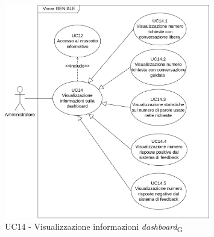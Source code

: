 \begin{figure}[H]
\centering
\includegraphics[width=0.8\textwidth]{contents/casi_duso/png/UC14.png}
\caption{UC14 - Visualizzazione informazioni \textit{dashboard}\textsubscript{G}}
\end{figure}


